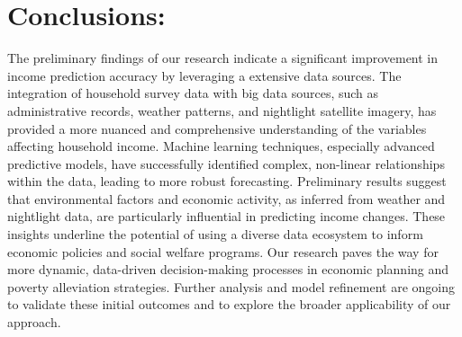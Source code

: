 \section{Conclusions:}

The preliminary findings of our research indicate a significant improvement in income prediction accuracy by leveraging a extensive data sources. The integration of household survey data with big data sources, such as administrative records, weather patterns, and nightlight satellite imagery, has provided a more nuanced and comprehensive understanding of the variables affecting household income. Machine learning techniques, especially advanced predictive models, have successfully identified complex, non-linear relationships within the data, leading to more robust forecasting. Preliminary results suggest that environmental factors and economic activity, as inferred from weather and nightlight data, are particularly influential in predicting income changes. These insights underline the potential of using a diverse data ecosystem to inform economic policies and social welfare programs. Our research paves the way for more dynamic, data-driven decision-making processes in economic planning and poverty alleviation strategies. Further analysis and model refinement are ongoing to validate these initial outcomes and to explore the broader applicability of our approach.